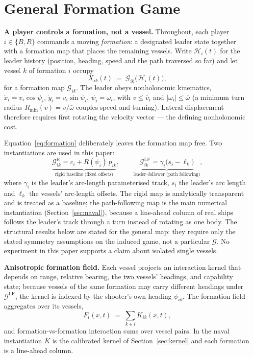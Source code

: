 \documentclass[12pt,a4paper]{article}
\begin{document}
\section{General Formation Game}\label{sec:model}

\noindent\textbf{A player controls a formation, not a vessel.}  Throughout,
each player $i\in\{B,R\}$ commands a moving \emph{formation}: a designated
leader state together with a formation map that places the remaining
vessels.  Write $\mathcal H_i(t)$ for the leader history (position, heading,
speed and the path traversed so far) and let vessel $k$ of formation $i$
occupy
\begin{equation}
X_{ik}(t) \;=\; \mathcal G_{ik}\bigl(\mathcal H_i(t)\bigr),
\label{eq:formation}
\end{equation}
for a formation map $\mathcal G_{ik}$.  The leader obeys nonholonomic
kinematics, $\dot x_i=v_i\cos\psi_i$, $\dot y_i=v_i\sin\psi_i$,
$\dot\psi_i=\omega_i$, with $v\le\bar v_i$ and
$|\omega_i|\le\bar\omega$ (a minimum turn radius
$R_{\min}(v)=v/\bar\omega$ couples speed and turning).  Lateral
displacement therefore requires first rotating the velocity vector --- the
defining nonholonomic cost.

Equation~\eqref{eq:formation} deliberately leaves the formation map free.
Two instantiations are used in this paper:
\begin{equation}
\underbrace{\mathcal G^{\mathrm{R}}_{ik}
      = c_i + R(\psi_i)\,p_{ik}}_{\text{rigid baseline (fixed offsets)}},
\qquad
\underbrace{\mathcal G^{\mathrm{LF}}_{ik}
      = \gamma_i\bigl(s_i - \ell_k\bigr)}_{\text{leader--follower (path following)}},
\label{eq:two-maps}
\end{equation}
where $\gamma_i$ is the leader's arc-length parameterised track, $s_i$ the
leader's arc length and $\ell_k$ the vessels' arc-length offsets.  The rigid
map is analytically transparent and is treated as a baseline; the
path-following map is the main numerical instantiation
(Section~\ref{sec:naval}), because a line-ahead column of real ships follows
the leader's track through a turn instead of rotating as one body.  The
structural results below are stated for the general map: they require only
the stated symmetry assumptions on the induced game, not a particular
$\mathcal G$.  No experiment in this paper supports a claim about isolated
single vessels.

\noindent\textbf{Anisotropic formation field.}  Each vessel projects an
interaction kernel that depends on range, relative bearing, the two vessels'
headings, and capability state; because vessels of the same formation may
carry different headings under $\mathcal G^{\mathrm{LF}}$, the kernel is
indexed by the shooter's own heading $\psi_{ik}$.  The formation field
aggregates over its vessels,
\begin{equation}
F_i(x,t) \;=\; \sum_{k\in i} K_{ik}(x,t),
\label{eq:ffield}
\end{equation}
and formation-vs-formation interaction sums over vessel pairs.  In the
naval instantiation $K$ is the calibrated kernel of
Section~\ref{sec:kernel} and each formation is a line-ahead column.
\end{document}
